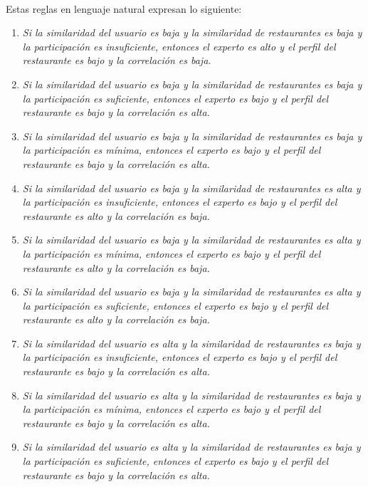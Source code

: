 \documentclass[12pt,letterpaper,oneside] {memoir}
\begin{document}
\paragraph*{}
Estas reglas en lenguaje natural expresan lo siguiente:

\begin{enumerate}
\item \textit{Si la similaridad del usuario es baja y la similaridad de restaurantes es baja y la participación es insuficiente, entonces el experto es alto y el perfil del restaurante es bajo y la correlación es baja. }  
\item \textit{Si la similaridad del usuario es baja y la similaridad de restaurantes es baja y la participación es suficiente, entonces el experto es bajo y el perfil del restaurante es bajo y la correlación es alta.}   
\item \textit{Si la similaridad del usuario es baja y la similaridad de restaurantes es baja y la participación es mínima, entonces el experto es bajo y el perfil del restaurante es bajo y la correlación es alta.}
\item \textit{Si la similaridad del usuario es baja y la similaridad de restaurantes es alta y la participación es insuficiente, entonces el experto es bajo y el perfil del restaurante es alto y la correlación es baja.}   
\item \textit{Si la similaridad del usuario es baja y la similaridad de restaurantes es alta y la participación es mínima, entonces el experto es bajo y el perfil del restaurante es alto y la correlación es baja.}   
\item  \textit{Si la similaridad del usuario es baja y la similaridad de restaurantes es alta y la participación es suficiente, entonces el experto es bajo y el perfil del restaurante es alto y la correlación es baja.}  
\item \textit{Si la similaridad del usuario es alta y la similaridad de restaurantes es baja y la participación es insuficiente, entonces el experto es bajo y el perfil del restaurante es bajo y la correlación es alta.}
\item \textit{Si la similaridad del usuario es alta y la similaridad de restaurantes es baja y la participación es mínima, entonces el experto es bajo y el perfil del restaurante es bajo y la correlación es alta.}
\item \textit{Si la similaridad del usuario es alta y la similaridad de restaurantes es baja y la participación es suficiente, entonces el experto es bajo y el perfil del restaurante es bajo y la correlación es alta.} 

\end{enumerate}
\end{document}
